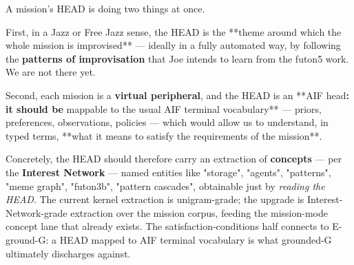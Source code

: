 \documentclass[11pt,oneside]{article}
\begin{document}
\begin{phasebox}[title={HEAD (Joe, 2026-06-10, verbatim sense)}]

A mission's HEAD is doing two things at once.

First, in a Jazz or Free Jazz sense, the HEAD is the **theme around which the
whole mission is improvised** --- ideally in a fully automated way, by following
the \textbf{patterns of improvisation} that Joe intends to learn from the futon5
work. We are not there yet.

Second, each mission is a \textbf{virtual peripheral}, and the HEAD is an **AIF
head\textbf{: it should be }mappable to the usual AIF terminal vocabulary** ---
priors, preferences, observations, policies --- which would allow us to
understand, in typed terms, **what it means to satisfy the requirements of
the mission**.

Concretely, the HEAD should therefore carry an extraction of \textbf{concepts} ---
per the \textbf{Interest Network} --- named entities like "storage", "agents",
"patterns", "meme graph", "futon3b", "pattern cascades", obtainable just by
\emph{reading the HEAD}. The current kernel extraction is unigram-grade; the
upgrade is Interest-Network-grade extraction over the mission corpus, feeding
the mission-mode concept lane that already exists. The satisfaction-conditions
half connects to E-ground-G: a HEAD mapped to AIF terminal vocabulary is what
grounded-G ultimately discharges against.

\end{phasebox}
\end{document}
